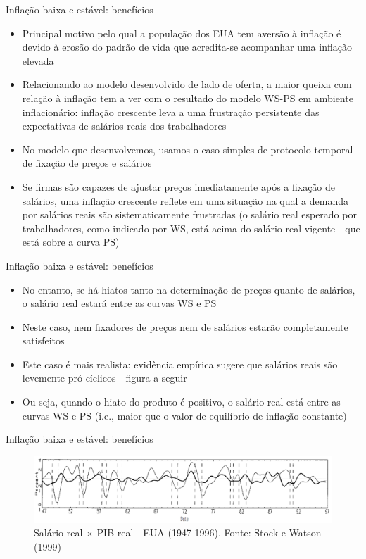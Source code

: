 \documentclass[10pt]{beamer}
\begin{document}
\begin{frame}
    {Inflação baixa e estável: benefícios}
    \begin{itemize}
        \item Principal motivo pelo qual a população dos EUA tem aversão à inflação é devido à erosão do padrão de vida que acredita-se acompanhar uma inflação elevada\bigskip
        \item Relacionando ao modelo desenvolvido de lado de oferta, a maior queixa com relação à inflação tem a ver com o resultado do modelo WS-PS em ambiente inflacionário: inflação crescente leva a uma frustração persistente das expectativas de salários reais dos trabalhadores\bigskip
        \item No modelo que desenvolvemos, usamos o caso simples de protocolo temporal de fixação de preços e salários\bigskip
        \item Se firmas são capazes de ajustar preços imediatamente após a fixação de salários, uma inflação crescente reflete em uma situação na qual a demanda por salários reais são sistematicamente frustradas (o salário real esperado por trabalhadores, como indicado por WS, está acima do salário real vigente - que está sobre a curva PS)
    \end{itemize}
\end{frame}

\begin{frame}
    {Inflação baixa e estável: benefícios}
    \begin{itemize}
        \item No entanto, se há hiatos tanto na determinação de preços quanto de salários, o salário real estará entre as curvas WS e PS\bigskip
        \item Neste caso, nem fixadores de preços nem de salários estarão completamente satisfeitos\bigskip
        \item Este caso é mais realista: evidência empírica sugere que salários reais são levemente pró-cíclicos - figura a seguir\bigskip
        \item Ou seja, quando o hiato do produto é positivo, o salário real está entre as curvas WS e PS (i.e., maior que o valor de equilíbrio de inflação constante)
    \end{itemize}
\end{frame}

\begin{frame}
    {Inflação baixa e estável: benefícios}
    \begin{figure}
        \includegraphics[width=\textwidth]{./figures/aula15_fig17.PNG}
        \caption{Salário real $\times$ PIB real - EUA (1947-1996). Fonte: Stock e Watson (1999)}
    \end{figure}
\end{frame}
\end{document}
